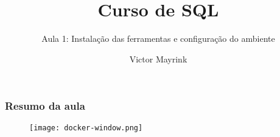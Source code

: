 \documentclass[t, 10pt, aspectratio=169, table, x11names]{beamer}
\begin{document}
	\author{Victor Mayrink}
	\title{Curso de SQL}
	\subtitle{Aula 1: Instalação das ferramentas e configuração do ambiente}

	\begin{frame}[plain]
		\maketitle
	\end{frame}
	
	\begin{frame}
		\frametitle{Resumo da aula}
		\vspace{0.5cm}
		\begin{figure}[h]
			\texttt{[image: docker-window.png]}
		\end{figure}
	\end{frame}
	
\end{document}
